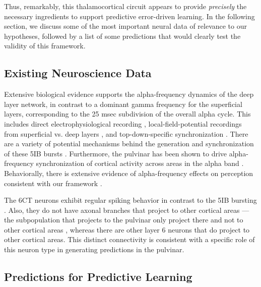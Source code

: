 \documentclass[11pt,twoside]{article}
\newif\myifpdf
\begin{document}
Thus, remarkably, this thalamocortical circuit appears to provide \emph{precisely} the necessary ingredients to support predictive error-driven learning.  In the following section, we discuss some of the most important neural data of relevance to our hypotheses, followed by a list of some predictions that would clearly test the validity of this framework.

\subsection{Existing Neuroscience Data}

Extensive biological evidence supports the alpha-frequency dynamics of the deep layer network, in contrast to a dominant gamma frequency for the superficial layers, corresponding to the 25 msec subdivision of the overall alpha cycle.  This includes direct electrophysiological recording \cite{LuczakBarthoHarris13}, local-field-potential recordings from superficial vs. deep layers \cite{BuffaloFriesLandmanEtAl11,MaierAdamsAuraEtAl10,MaierAuraLeopold11,SpaakBonnefondMaierEtAl12,XingYehBurnsEtAl12,BastosVezoliBosmanEtAl15,MichalareasVezolivanPeltEtAl16}, and top-down-specific synchronization \cite{vonSteinChiangKonig00,vanKerkoerleSelfDagninoEtAl14}. There are a variety of potential mechanisms behind the generation and synchronization of these 5IB bursts \cite{ConnorsGutnickPrince82,LopesdaSilva91,LorinczKekesiJuhaszEtAl09,FranceschettiGuatteoPanzicaEtAl95,SaalmannPinskWangEtAl12}.  Furthermore, the pulvinar has been shown to drive alpha-frequency synchronization of cortical activity across areas in the alpha band \cite{SaalmannPinskWangEtAl12}.  Behaviorally, there is extensive evidence of alpha-frequency effects on perception consistent with our framework \cite{NunnOsselton74,VarelaToroJohnEtAl81,VanRullenKoch03,JensenBonnefondVanRullen12}.

The 6CT neurons exhibit regular spiking behavior in contrast to the 5IB bursting . Also, they do not have axonal branches that project to other cortical areas --- the subpopulation that projects to the pulvinar only project there and not to other cortical areas \cite{PetrofViaeneSherman12}, whereas there are other layer 6 neurons that do project to other cortical areas.  This distinct connectivity is consistent with a specific role of this neuron type in generating predictions in the pulvinar. 

\subsection{Predictions for Predictive Learning}
\end{document}
